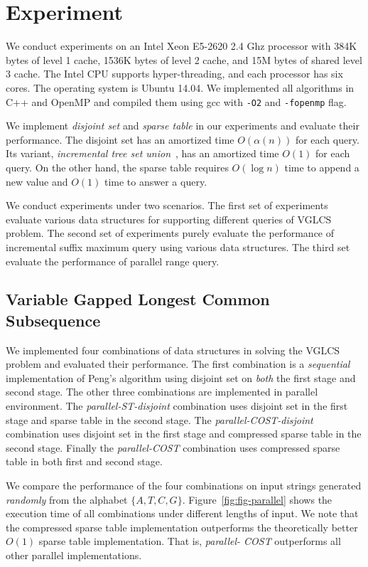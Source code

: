 \section{Experiment} \label{sec:Experiment}

We conduct experiments on an Intel Xeon E5-2620 2.4 Ghz processor with
384K bytes of level 1 cache, 1536K bytes of level 2 cache, and 15M
bytes of shared level 3 cache.  The Intel CPU supports
hyper-threading, and each processor has six cores.  The operating
system is Ubuntu 14.04.  We implemented all algorithms in C++ and
OpenMP and compiled them using gcc with {\tt -O2} and {\tt -fopenmp}
flag.

We implement {\em disjoint set} and {\em sparse table} in our
experiments and evaluate their performance.  The disjoint set has an
amortized time $O(\alpha(n))$ for each query.  Its variant, {\em
  incremental tree set union}~\cite{Gabow1983ALA}, has an amortized
time $O(1)$ for each query.  On the other hand, the sparse table
requires $O(\log n)$ time to append a new value and $O(1)$ time to
answer a query.

We conduct experiments under two scenarios.  The first set of
experiments evaluate various data structures for supporting different
queries of VGLCS problem.  The second set of experiments purely
evaluate the performance of incremental suffix maximum query using
various data structures.  The third set evaluate the performance of
parallel range query.

\subsection{Variable Gapped Longest Common Subsequence}

We implemented four combinations of data structures in solving the
VGLCS problem and evaluated their performance.  The first combination
is a {\em sequential} implementation of Peng's algorithm using
disjoint set on {\em both} the first stage and second stage.  The
other three combinations are implemented in parallel environment.  The
{\em parallel-ST-disjoint} combination uses disjoint set in the first
stage and sparse table in the second stage.  The {\em
  parallel-COST-disjoint} combination uses disjoint set in the first
stage and compressed sparse table in the second stage.  Finally the
{\em parallel-COST} combination uses compressed sparse table in both
first and second stage.

We compare the performance of the four combinations on input strings
generated {\em randomly} from the alphabet $\{A, T, C, G\}$.
Figure~\ref{fig:fig-parallel} shows the execution time of all
combinations under different lengths of input.  We note that the
compressed sparse table implementation outperforms the theoretically
better $O(1)$ sparse table implementation.  That is, {\em   parallel-
COST} outperforms all other parallel implementations.

